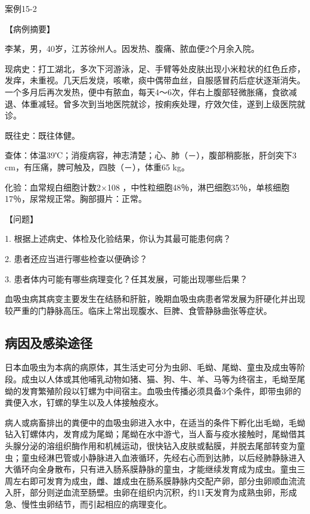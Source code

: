 \begin{framed}
{案例15-2}

{【病例摘要】}

李某，男，40岁，江苏徐州人。因发热、腹痛、脓血便2个月余入院。

现病史：打工湖北，多次下河游泳，足、手臂等处皮肤出现小米粒状的红色丘疹，发痒，未重视。几天后发烧，咳嗽，痰中偶带血丝，自服感冒药后症状逐渐消失。一个多月后再次发热，便中有脓血，每天4～6次，伴右上腹部轻微胀痛，食欲减退、体重减轻。曾多次到当地医院就诊，按痢疾处理，疗效欠佳，遂到上级医院就诊。

既往史：既往体健。

查体：体温39℃；消瘦病容，神志清楚；心、肺（－），腹部稍膨胀，肝剑突下3
cm，有压痛，脾可触及，四肢（－），体重65 kg。

化验：血常规白细胞计数2×10{8}
，中性粒细胞48％，淋巴细胞35％，单核细胞17％，尿常规正常。胸部摄片：正常。

{【问题】}

1. 根据上述病史、体检及化验结果，你认为其最可能患何病？

2. 患者还应当进行哪些检查以便确诊？

3. 患者体内可能有哪些病理变化？任其发展，可能出现哪些后果？
\end{framed}

血吸虫病其病变主要发生在结肠和肝脏，晚期血吸虫病患者常发展为肝硬化并出现较严重的门静脉高压。临床上常出现腹水、巨脾、食管静脉曲张等症状。

\subsection{病因及感染途径}

日本血吸虫为本病的病原体，其生活史可分为虫卵、毛蚴、尾蚴、童虫及成虫等阶段。成虫以人体或其他哺乳动物如猪、猫、狗、牛、羊、马等为终宿主，毛蚴至尾蚴的发育繁殖阶段以钉螺为中间宿主。血吸虫传播必须具备3个条件，即带虫卵的粪便入水，钉螺的孳生以及人体接触疫水。

病人或病畜排出的粪便中的血吸虫卵进入水中，在适当的条件下孵化出毛蚴，毛蚴钻入钉螺体内，发育成为尾蚴；尾蚴在水中游弋，当人畜与疫水接触时，尾蚴借其头腺分泌的溶组织酶作用和机械运动，很快钻入皮肤或黏膜，并脱去尾部转变为童虫；童虫经淋巴管或小静脉进入血液循环，先经右心而到达肺，以后经肺静脉进入大循环向全身散布，只有进入肠系膜静脉的童虫，才能继续发育成为成虫。童虫三周左右即可发育为成虫，雌、雄成虫在肠系膜静脉内交配产卵，部分虫卵顺血流流入肝，部分则逆血流至肠壁。虫卵在组织内沉积，约11天发育为成熟虫卵，形成急、慢性虫卵结节，而引起相应的病理变化。

